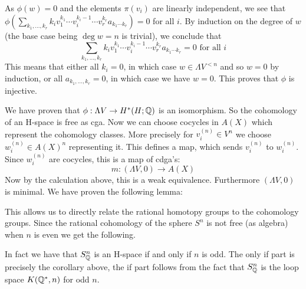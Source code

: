 As $\phi(w) = 0$ and the elements $\pi(v_i)$ are linearly independent, we see that $\phi(\sum_{k_1, \ldots, k_r} k_i v_1^{k_1} \cdots v_i^{k_i - 1} \cdots v_r^{k_r}a_{k_1 \cdots k_r}) = 0$ for all $i$. By induction on the degree of $w$ (the base case being $\deg{w} = n$ is trivial), we conclude that
\[ \sum_{k_1, \ldots, k_r} k_i v_1^{k_1} \cdots v_i^{k_i - 1} \cdots v_r^{k_r}a_{k_1 \cdots k_r} = 0 \text{ for all } i\]
This means that either all $k_i = 0$, in which case $w \in \Lambda V^{<n}$ and so $w = 0$ by induction, or all $a_{k_1, \ldots, k_r} = 0$, in which case we have $w = 0$. This proves that $\phi$ is injective.

We have proven that $\phi : \Lambda V \to H^\ast(H; \mathbb{Q})$ is an isomorphism. So the cohomology of an H-space is free as cga. Now we can choose cocycles in $A(X)$ which represent the cohomology classes. More precisely for $v_i^{(n)} \in V^n$ we choose $w_i^{(n)} \in A(X)^n$ representing it. This defines a map, which sends $v_i^{(n)}$ to $w_i^{(n)}$. Since $w_i^{(n)}$ are cocycles, this is a map of cdga's:
\[ m : (\Lambda V, 0) \to A(X) \]
Now by the calculation above, this is a weak equivalence. Furthermore $(\Lambda V, 0)$ is minimal. We have proven the following lemma:


This allows us to directly relate the rational homotopy groups to the cohomology groups. Since the rational cohomology of the sphere $S^n$ is not free (as algebra) when $n$ is even we get the following.


In fact we have that $S^n_{\mathbb{Q}}$ is an H-space if and only if $n$ is odd. The only if part is precisely the corollary above, the if part follows from the fact that $S^n_{\mathbb{Q}}$ is the loop space $K(\mathbb{Q}^\ast, n)$ for odd $n$.

